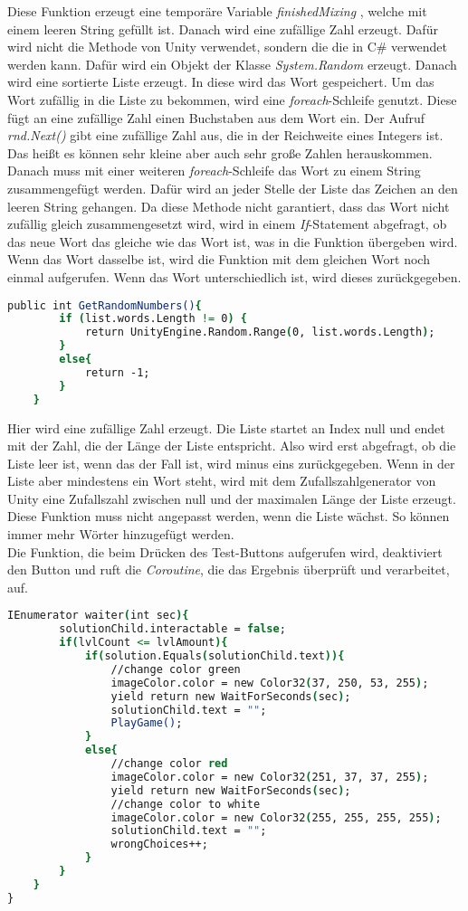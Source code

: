Diese Funktion erzeugt eine temporäre Variable \textit{finishedMixing} , welche mit einem leeren String gefüllt ist. Danach wird eine zufällige Zahl erzeugt. Dafür wird nicht die Methode von Unity verwendet, sondern die die in C\# verwendet werden kann. Dafür wird ein Objekt der Klasse \textit{System.Random} erzeugt. Danach wird eine sortierte Liste erzeugt. In diese wird das Wort gespeichert. Um das Wort zufällig in die Liste zu bekommen, wird eine \textit{foreach}-Schleife genutzt. Diese fügt an eine zufällige Zahl einen Buchstaben aus dem Wort ein. Der Aufruf \textit{rnd.Next()} gibt eine zufällige Zahl aus, die in der Reichweite eines Integers ist. Das heißt es können sehr kleine aber auch sehr große Zahlen herauskommen. Danach muss mit einer weiteren \textit{foreach}-Schleife das Wort zu einem String zusammengefügt werden. Dafür wird an jeder Stelle der Liste das Zeichen an den leeren String gehangen. Da diese Methode nicht garantiert, dass das Wort nicht zufällig gleich zusammengesetzt wird, wird in einem \textit{If}-Statement abgefragt, ob das neue Wort das gleiche wie das Wort ist, was in die Funktion übergeben wird. Wenn das Wort dasselbe ist, wird die Funktion mit dem gleichen Wort noch einmal aufgerufen. Wenn das Wort unterschiedlich ist, wird dieses zurückgegeben.\\
\begin{lstlisting}[language=csh, caption={WordMix.cs GetRandomNumbers-Funktion}]
	public int GetRandomNumbers(){
		if (list.words.Length != 0) {
			return UnityEngine.Random.Range(0, list.words.Length);
		}
		else{
			return -1;
		}
	}
\end{lstlisting}
Hier wird eine zufällige Zahl erzeugt. Die Liste startet an Index null und endet mit der Zahl, die der Länge der Liste entspricht. Also wird erst abgefragt, ob die Liste leer ist, wenn das der Fall ist, wird minus eins zurückgegeben. Wenn in der Liste aber mindestens ein Wort steht, wird mit dem Zufallszahlgenerator von Unity eine Zufallszahl zwischen null und der maximalen Länge der Liste erzeugt. Diese Funktion muss nicht angepasst werden, wenn die Liste wächst. So können immer mehr Wörter hinzugefügt werden.\\
Die Funktion, die beim Drücken des Test-Buttons aufgerufen wird, deaktiviert den Button und ruft die \textit{Coroutine}, die das Ergebnis überprüft und verarbeitet, auf.\\
\begin{lstlisting}[language=csh, caption={WordMix.cs waiter-Funktion}]
	IEnumerator waiter(int sec){
		solutionChild.interactable = false;
		if(lvlCount <= lvlAmount){
			if(solution.Equals(solutionChild.text)){
				//change color green
				imageColor.color = new Color32(37, 250, 53, 255);
				yield return new WaitForSeconds(sec);
				solutionChild.text = "";
				PlayGame();
			}
			else{
				//change color red
				imageColor.color = new Color32(251, 37, 37, 255);
				yield return new WaitForSeconds(sec);
				//change color to white
				imageColor.color = new Color32(255, 255, 255, 255);
				solutionChild.text = "";
				wrongChoices++;
			}
		}
	}
}
\end{lstlisting}
